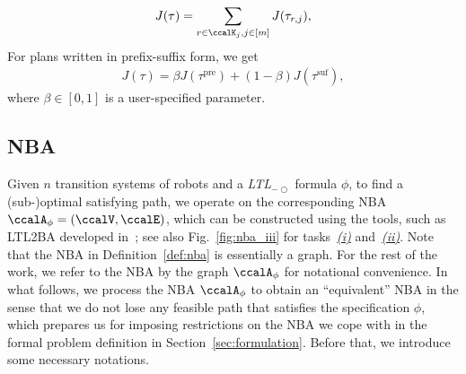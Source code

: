 \documentclass[Afour,sageh,times]{sagej}
\newcommand{\ltl}{ {\it LTL}$_{-\bigcirc}$ }
\newcommand{\autop}{\ccalA_{\phi}}
\begin{document}
\begingroup\makeatletter{}\check@mathfonts
\def\maketag@@@#1{\hbox{\m@th\normalsize\normalfont#1}}%
\begin{align}
  J(\tau) = \sum_{{r \in \ccalK_j, j \in [m]}} J(\tau_{r,j}),
\end{align}
\endgroup
For  plans written in prefix-suffix form, we get
\begingroup\makeatletter\def\f@size{10}\check@mathfonts
\def\maketag@@@#1{\hbox{\m@th\normalsize\normalfont#1}}%
\begin{align}\label{eq:cost}
J(\tau) = \beta J(\tau^{\text{pre}}) + (1-\beta) J(\tau^{\text{suf}}),
\end{align}
\endgroup
where $\beta\in [0,1]$ is a user-specified parameter.

\subsection{NBA}\label{sec:nba}
Given $n$ transition systems of robots and a \ltl formula $\phi$, to find a (sub-)optimal satisfying path, we operate on the corresponding NBA $\autop = (\ccalV, \ccalE)$, which can  be constructed using the tools, such as LTL2BA developed in~\cite{gastin2001fast}; see also Fig.~\ref{fig:nba_iii} for tasks~\hyperref[task:i]{\it (i)} and~\hyperref[task:ii]{\it (ii)}. Note that the NBA in Definition~\ref{def:nba} is essentially a graph. For the rest of the work, we refer to the NBA by the graph $\autop$ for notational convenience. In what follows, we process the NBA $\autop$ to obtain an ``equivalent'' NBA in the sense that we do not lose any feasible path that satisfies the specification $\phi$, which prepares us for imposing restrictions on the NBA we cope with in the formal problem definition in Section~\ref{sec:formulation}. Before that, we introduce some necessary notations.
\end{document}
